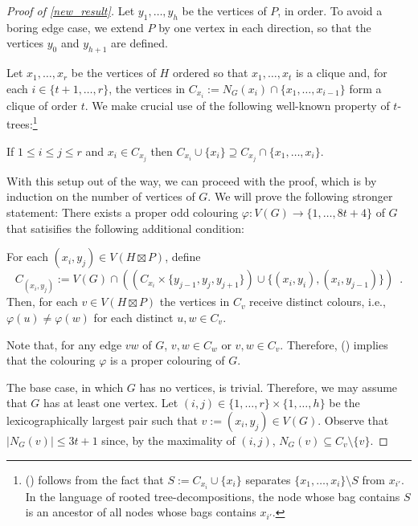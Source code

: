 \documentclass{patmorin}
\begin{document}
\begin{proof}[Proof of \cref{new_result}]
  Let $y_1,\ldots,y_h$ be the vertices of $P$, in order.  To avoid a boring edge case, we extend $P$ by one vertex in each direction, so that the vertices $y_0$ and $y_{h+1}$ are defined.

  Let $x_1,\ldots,x_r$ be the vertices of $H$ ordered so that $x_1,\ldots,x_{t}$ is a clique and, for each $i\in\{t+1,\ldots,r\}$, the vertices in $C_{x_i}:=N_G(x_i)\cap\{x_1,\ldots,x_{i-1}\}$ form a clique of order $t$.  We make crucial use of the following well-known property of $t$-trees:\footnote{() follows from the fact that $S:=C_{x_i}\cup\{x_i\}$ separates $\{x_1,\ldots,x_i\}\setminus S$ from $x_{i'}$.  In the language of rooted tree-decompositions, the node whose bag contains $S$ is an ancestor of all nodes whose bags contains $x_{i'}$.}
  \begin{compactitem}[(\ding{74})]
    \item If $1\le i \le j\le r$ and $x_i \in C_{x_{j}}$ then $C_{x_i}\cup\{x_i\}\supseteq C_{x_{j}}\cap\{x_1,\ldots,x_{i}\}$.
  \end{compactitem}

  With this setup out of the way, we can proceed with the proof, which is by induction on the number of vertices of $G$.  We will prove the following stronger statement:  There exists a proper odd colouring $\varphi:V(G)\to\{1,\ldots,8t+4\}$ of $G$ that satisifies the following additional condition:
  \begin{compactitem}[(\ding{96})]
    \item For each $(x_i,y_j)\in V(H\boxtimes P)$, define
    \[
      C_{(x_i,y_j)}:=V(G)\cap \left(\left(C_{x_i}\times\{y_{j-1}, y_{j},y_{j+1}\}\right)\cup\{(x_i,y_i),(x_i,y_{j-1})\}\right)
      \enspace .
    \]
    Then, for each $v\in V(H\boxtimes P)$ the vertices in $C_v$ receive distinct colours, i.e., $\varphi(u)\neq \varphi(w)$ for each distinct $u,w\in C_v$.
  \end{compactitem}
  Note that, for any edge $vw$ of $G$, $v,w \in C_w$ or $v,w\in C_v$.  Therefore, () implies that the colouring $\varphi$ is a proper colouring of $G$.

  The base case, in which $G$ has no vertices, is trivial. Therefore, we may assume that $G$ has at least one vertex.  Let $(i,j)\in\{1,\ldots,r\}\times\{1,\ldots,h\}$ be the lexicographically largest pair such that $v:=(x_i,y_j)\in V(G)$.  Observe that $|N_G(v)|\le 3t+1$ since, by the maximality of $(i,j)$,  $N_G(v)\subseteq C_v\setminus\{v\}$.


\end{proof}
\end{document}
